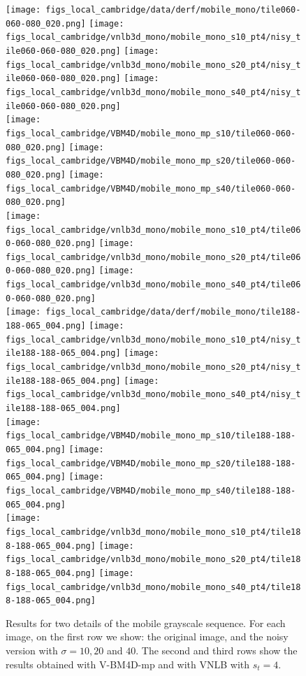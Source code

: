 \documentclass[10pt, a4paper]{article}
\begin{document}
\begin{figure}[htpb!]
	\centering
	\texttt{[image: figs\_local\_cambridge/data/derf/mobile\_mono/tile060-060-080\_020.png]}%
	\texttt{[image: figs\_local\_cambridge/vnlb3d\_mono/mobile\_mono\_s10\_pt4/nisy\_tile060-060-080\_020.png]}%
	\texttt{[image: figs\_local\_cambridge/vnlb3d\_mono/mobile\_mono\_s20\_pt4/nisy\_tile060-060-080\_020.png]}%
	\texttt{[image: figs\_local\_cambridge/vnlb3d\_mono/mobile\_mono\_s40\_pt4/nisy\_tile060-060-080\_020.png]}\\
	\hspace               {0.2\textwidth}%
	\texttt{[image: figs\_local\_cambridge/VBM4D/mobile\_mono\_mp\_s10/tile060-060-080\_020.png]}%
	\texttt{[image: figs\_local\_cambridge/VBM4D/mobile\_mono\_mp\_s20/tile060-060-080\_020.png]}%
	\texttt{[image: figs\_local\_cambridge/VBM4D/mobile\_mono\_mp\_s40/tile060-060-080\_020.png]}\\
	\hspace               {0.2\textwidth}%
	\texttt{[image: figs\_local\_cambridge/vnlb3d\_mono/mobile\_mono\_s10\_pt4/tile060-060-080\_020.png]}%
	\texttt{[image: figs\_local\_cambridge/vnlb3d\_mono/mobile\_mono\_s20\_pt4/tile060-060-080\_020.png]}%
	\texttt{[image: figs\_local\_cambridge/vnlb3d\_mono/mobile\_mono\_s40\_pt4/tile060-060-080\_020.png]}\\

	\vspace{.1cm}
	\texttt{[image: figs\_local\_cambridge/data/derf/mobile\_mono/tile188-188-065\_004.png]}%
	\texttt{[image: figs\_local\_cambridge/vnlb3d\_mono/mobile\_mono\_s10\_pt4/nisy\_tile188-188-065\_004.png]}%
	\texttt{[image: figs\_local\_cambridge/vnlb3d\_mono/mobile\_mono\_s20\_pt4/nisy\_tile188-188-065\_004.png]}%
	\texttt{[image: figs\_local\_cambridge/vnlb3d\_mono/mobile\_mono\_s40\_pt4/nisy\_tile188-188-065\_004.png]}\\
	\hspace               {0.2\textwidth}%
	\texttt{[image: figs\_local\_cambridge/VBM4D/mobile\_mono\_mp\_s10/tile188-188-065\_004.png]}%
	\texttt{[image: figs\_local\_cambridge/VBM4D/mobile\_mono\_mp\_s20/tile188-188-065\_004.png]}%
	\texttt{[image: figs\_local\_cambridge/VBM4D/mobile\_mono\_mp\_s40/tile188-188-065\_004.png]}\\
	\hspace               {0.2\textwidth}%
	\texttt{[image: figs\_local\_cambridge/vnlb3d\_mono/mobile\_mono\_s10\_pt4/tile188-188-065\_004.png]}%
	\texttt{[image: figs\_local\_cambridge/vnlb3d\_mono/mobile\_mono\_s20\_pt4/tile188-188-065\_004.png]}%
	\texttt{[image: figs\_local\_cambridge/vnlb3d\_mono/mobile\_mono\_s40\_pt4/tile188-188-065\_004.png]}\\
	\caption{Results for two details of the mobile grayscale sequence. For each
	image, on the first row we show: the original image, and the noisy version
	with $\sigma = 10,20$ and $40$. The second and third rows show the results
	obtained with V-BM4D-mp and with VNLB with $s_t = 4$.}
	\label{fig:results_mobile_mono}
\end{figure}
\end{document}
